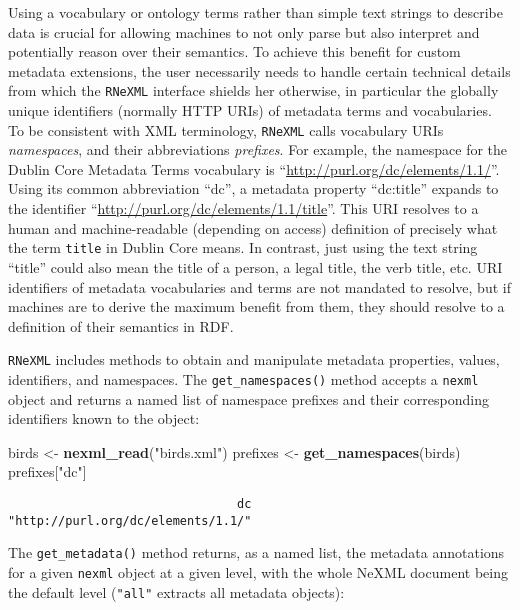 \documentclass[author-year, review, 11pt]{components/elsarticle} %
\newenvironment{Shaded}{\begin{snugshade}}{\end{snugshade}}
\newcommand{\KeywordTok}[1]{\textcolor[rgb]{0.13,0.29,0.53}{\textbf{{#1}}}}
\newcommand{\StringTok}[1]{\textcolor[rgb]{0.31,0.60,0.02}{{#1}}}
\newcommand{\NormalTok}[1]{{#1}}
\begin{document}
Using a vocabulary or ontology terms rather than simple text strings to
describe data is crucial for allowing machines to not only parse but
also interpret and potentially reason over their semantics. To achieve
this benefit for custom metadata extensions, the user necessarily needs
to handle certain technical details from which the \texttt{RNeXML}
interface shields her otherwise, in particular the globally unique
identifiers (normally HTTP URIs) of metadata terms and vocabularies. To
be consistent with XML terminology, \texttt{RNeXML} calls vocabulary
URIs \emph{namespaces}, and their abbreviations \emph{prefixes}. For
example, the namespace for the Dublin Core Metadata Terms vocabulary is
``\url{http://purl.org/dc/elements/1.1/}''. Using its common
abbreviation ``dc'', a metadata property ``dc:title'' expands to the
identifier ``\url{http://purl.org/dc/elements/1.1/title}''. This URI
resolves to a human and machine-readable (depending on access)
definition of precisely what the term \texttt{title} in Dublin Core
means. In contrast, just using the text string ``title'' could also mean
the title of a person, a legal title, the verb title, etc. URI
identifiers of metadata vocabularies and terms are not mandated to
resolve, but if machines are to derive the maximum benefit from them,
they should resolve to a definition of their semantics in RDF.

\texttt{RNeXML} includes methods to obtain and manipulate metadata
properties, values, identifiers, and namespaces. The
\texttt{get\_namespaces()} method accepts a \texttt{nexml} object and
returns a named list of namespace prefixes and their corresponding
identifiers known to the object:

\begin{Shaded}
\begin{Highlighting}[]
\NormalTok{birds <-}\StringTok{ }\KeywordTok{nexml_read}\NormalTok{(}\StringTok{"birds.xml"}\NormalTok{)}
\NormalTok{prefixes <-}\StringTok{ }\KeywordTok{get_namespaces}\NormalTok{(birds)}
\NormalTok{prefixes[}\StringTok{"dc"}\NormalTok{]}
\end{Highlighting}
\end{Shaded}

\begin{verbatim}
                                dc 
"http://purl.org/dc/elements/1.1/" 
\end{verbatim}

The \texttt{get\_metadata()} method returns, as a named list, the
metadata annotations for a given \texttt{nexml} object at a given level,
with the whole NeXML document being the default level (\texttt{"all"}
extracts all metadata objects):
\end{document}

